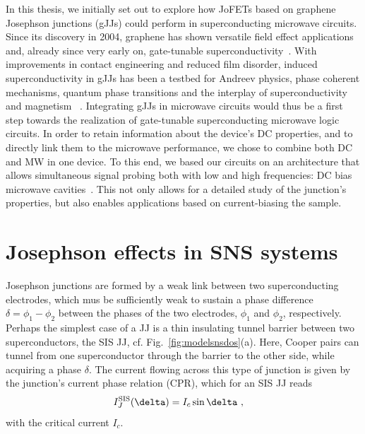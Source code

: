 In this thesis, we initially set out to explore how JoFETs based on graphene Josephson junctions (gJJs) could perform in superconducting microwave circuits.
%
Since its discovery in 2004, graphene has shown versatile field effect applications and, already since very early on, gate-tunable superconductivity~\cite{novoselovElectricFieldEffect2004c,heerscheBipolarSupercurrentGraphene2007a}.
%
With improvements in contact engineering and reduced film disorder, induced superconductivity in gJJs has been a testbed for Andreev physics, phase coherent mechanisms, quantum phase transitions and the interplay of superconductivity and magnetism ~\cite{leeProximityCouplingSuperconductorgraphene2018a}.
%
Integrating gJJs in microwave circuits would thus be a first step towards the realization of gate-tunable superconducting microwave logic circuits.
%
In order to retain information about the device's DC properties, and to directly link them to the microwave performance, we chose to combine both DC and MW in one device.
%
To this end, we based our circuits on an architecture that allows simultaneous signal probing both with low and high frequencies: DC bias microwave cavities~\cite{bosmanBroadbandArchitectureGalvanically2015c}.
%
This not only allows for a detailed study of the junction's properties, but also enables applications based on current-biasing the sample.







\section{Josephson effects in SNS systems}

Josephson junctions are formed by a weak link between two superconducting electrodes, which mus be sufficiently weak to sustain a phase difference $\delta=\phi_1-\phi_2$ between the phases of the two electrodes, $\phi_1$ and $\phi_2$, respectively.
%
Perhaps the simplest case of a JJ is a thin insulating tunnel barrier between two superconductors, the SIS JJ, cf. Fig.~\ref{fig:modelsnsdos}(a).
%
Here, Cooper pairs can tunnel from one superconductor through the barrier to the other side, while acquiring a phase $\delta$.
%
The current flowing across this type of junction is given by the junction's current phase relation (CPR), which for an SIS JJ reads
%
\begin{align}
I_J^{\rm SIS}(\delta) &= I_c\sin\delta \ ,
\end{align}
%
with the critical current $I_c$.

